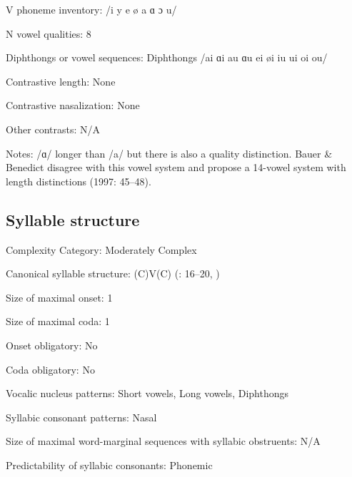 {\begin{appendixdesc}
\item[V phoneme inventory:] /i y e ø a ɑ ɔ u/

\item[N vowel qualities:] 8

\item[Diphthongs or vowel sequences:] Diphthongs /ai ɑi au ɑu ei øi iu ui oi ou/

\item[Contrastive length:] None

\item[Contrastive nasalization:] None

\item[Other contrasts:] N/A

\item[Notes:] /ɑ/ longer than /a/ but there is also a quality distinction. Bauer \& Benedict disagree with this vowel system and propose a 14-vowel system with length distinctions (1997: 45--48).
\end{appendixdesc}
\subsection*{Syllable structure}
\begin{appendixdesc}

\item[Complexity Category:] Moderately Complex

\item[Canonical syllable structure:] (C)V(C) (\citealt{MatthewsYip1994}: 16--20, \citealt{BauerBenedict1997})

\item[Size of maximal onset:] 1

\item[Size of maximal coda:] 1

\item[Onset obligatory:] No

\item[Coda obligatory:] No

\item[Vocalic nucleus patterns:] Short vowels, Long vowels, Diphthongs

\item[Syllabic consonant patterns:] Nasal

\item[Size of maximal word-marginal sequences with syllabic obstruents:] N/A

\item[Predictability of syllabic consonants:] Phonemic


\end{appendixdesc}}
